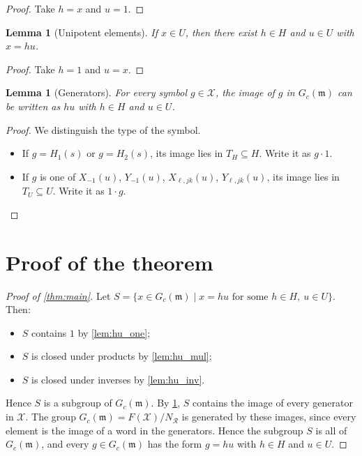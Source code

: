 \documentclass[11pt]{article}
\newtheorem{lemma}[theorem]{Lemma}
\theoremstyle{definition}
\theoremstyle{remark}
\newcommand{\Gm}{G_c(\mathfrak{m})}
\begin{document}
\begin{proof}
Take $h=x$ and $u=1$.
\end{proof}

\begin{lemma}[Unipotent elements]\label{lem:hu_of_unip}
If $x\in U$, then there exist $h\in H$ and $u\in U$ with $x=hu$.
\end{lemma}

\begin{proof}
Take $h=1$ and $u=x$.
\end{proof}

\begin{lemma}[Generators]\label{lem:hu_gen}
For every symbol $g\in\mathcal{X}$, the image of $g$ in $\Gm$ can be written as $hu$ with $h\in H$ and $u\in U$.
\end{lemma}

\begin{proof}
We distinguish the type of the symbol.
\begin{itemize}
\item If $g=H_1(s)$ or $g=H_2(s)$, its image lies in $T_H\subseteq H$. Write it as $g\cdot 1$.
\item If $g$ is one of $X_{-1}(u)$, $Y_{-1}(u)$, $X_{\ell,jk}(u)$, $Y_{\ell,jk}(u)$, its image lies in $T_U\subseteq U$. Write it as $1\cdot g$. \qedhere
\end{itemize}
\end{proof}

\section{Proof of the theorem}

\begin{proof}[Proof of \cref{thm:main}]
Let $S=\{x\in\Gm \mid x=hu \text{ for some } h\in H,\ u\in U\}$. Then:
\begin{itemize}
\item $S$ contains $1$ by \cref{lem:hu_one};
\item $S$ is closed under products by \cref{lem:hu_mul};
\item $S$ is closed under inverses by \cref{lem:hu_inv}.
\end{itemize}
Hence $S$ is a subgroup of $\Gm$. By \cref{lem:hu_gen}, $S$ contains the image of every generator in $\mathcal{X}$. The group $\Gm=F(\mathcal{X})/N_{\mathcal{R}}$ is generated by these images, since every element is the image of a word in the generators. Hence the subgroup $S$ is all of $\Gm$, and every $g\in\Gm$ has the form $g=hu$ with $h\in H$ and $u\in U$.
\end{proof}
\end{document}
